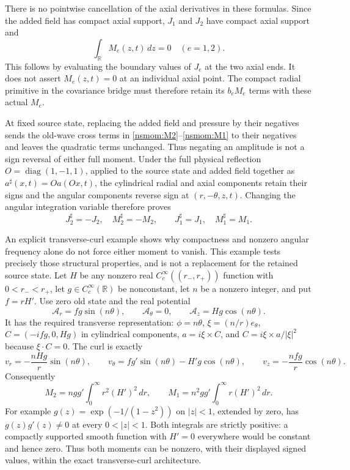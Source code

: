 \documentclass[11pt]{article}
\begin{document}
There is no pointwise cancellation of the axial derivatives in these
formulas. Since the added field has compact axial support, $J_1$ and
$J_2$ have compact axial support and
\begin{equation}
 \int_{\mathbb R}M_e(z,t)\,dz=0\quad(e=1,2).
 \label{nsmom:global_zero}
\end{equation}
This follows by evaluating the boundary values of $J_e$ at the two
axial ends. It does not assert $M_e(z,t)=0$ at an individual axial
point. The compact radial primitive in the covariance bridge must
therefore retain its $b_eM_e$ terms with these actual $M_e$.

At fixed source state, replacing the added field and pressure by their
negatives sends the old-wave cross terms in \eqref{nsmom:M2}--\eqref{nsmom:M1}
to their negatives and leaves the quadratic terms unchanged. Thus
negating an amplitude is not a sign reversal of either full moment.
Under the full physical reflection
$O=\operatorname{diag}(1,-1,1)$, applied to the source state and added
field together as $a^\sharp(x,t)=Oa(Ox,t)$, the cylindrical radial and
axial components retain their signs and the angular components reverse
sign at $(r,-\theta,z,t)$. Changing the angular integration variable
therefore proves
\[
 J_2^\sharp=-J_2,\quad M_2^\sharp=-M_2,
 \qquad J_1^\sharp=J_1,\quad M_1^\sharp=M_1.
\]

An explicit transverse-curl example shows why compactness and nonzero
angular frequency alone do not force either moment to vanish. This
example tests precisely those structural properties, and is not a
replacement for the retained source state. Let $H$ be any nonzero real
$C_c^\infty((r_-,r_+))$ function with $0<r_-<r_+$, let
$g\in C_c^\infty(\mathbb R)$ be nonconstant, let $n$ be a nonzero
integer, and put $f=rH'$. Use zero old state and the real potential
\[
 \mathcal A_r=fg\sin(n\theta),\qquad
 \mathcal A_\theta=0,\qquad
 \mathcal A_z=Hg\cos(n\theta).
\]
It has the required transverse representation:
$\phi=n\theta$, $\xi=(n/r)e_\theta$,
$C=(-ifg,0,Hg)$ in cylindrical components,
$a=i\xi\times C$, and
$C=i\xi\times a/|\xi|^2$ because $\xi\cdot C=0$.
The curl is exactly
\[
 v_r=-\frac{nHg}{r}\sin(n\theta),\qquad
 v_\theta=fg'\sin(n\theta)-H'g\cos(n\theta),\qquad
 v_z=-\frac{nfg}{r}\cos(n\theta).
\]
Consequently
\[
 M_2=ngg'\int_0^\infty r^2(H')^2\,dr,
 \qquad
 M_1=n^2gg'\int_0^\infty r(H')^2\,dr.
\]
For example $g(z)=\exp(-1/(1-z^2))$ on $|z|<1$, extended by zero,
has $g(z)g'(z)\ne0$ at every $0<|z|<1$. Both integrals are strictly
positive: a compactly supported smooth function with $H'=0$ everywhere
would be constant and hence zero. Thus both moments can be nonzero,
with their displayed signed values, within the exact transverse-curl
architecture.
\end{document}
